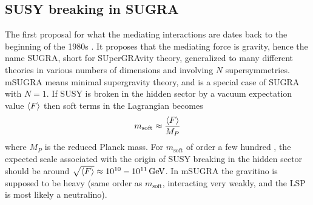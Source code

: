\subsection*{SUSY breaking in SUGRA}
\noindent\justify
The first proposal for what the mediating interactions are dates back to the beginning of the 1980s \cite{Chamseddine:1982jx,Barbieri:1982eh,Ibanez:1982ee,Hall:1983iz,Ellis:1982wr}.
It proposes that the mediating force is gravity, hence the name SUGRA, short for SUperGRAvity theory, generalized to many different theories in various numbers of dimensions and involving $N$ supersymmetries. 
mSUGRA means minimal supergravity theory, and is a special case of SUGRA with $N=1$. 
If SUSY is broken in the hidden sector by a vacuum expectation value $\braket{F}$ then soft terms in the Lagrangian becomes
\begin{equation}
m_{\mathrm{soft}}\approx\frac{\braket{F}}{M_{P}}
\end{equation}
where $M_{P}$ is the reduced Planck mass. 
For $m_{\mathrm{soft}}$ of order a few hundred \GeV, the expected􏰛scale associated with the origin of SUSY breaking in the hidden sector should be around $\sqrt{\braket{F}}\approx10^{10}-10^{11}\,\text{Ge\hspace{-.08em}V}$.
In mSUGRA the gravitino is supposed to be heavy (same order as $m_{\mathrm{soft}}$, interacting very weakly, and the LSP is most likely a neutralino). 
